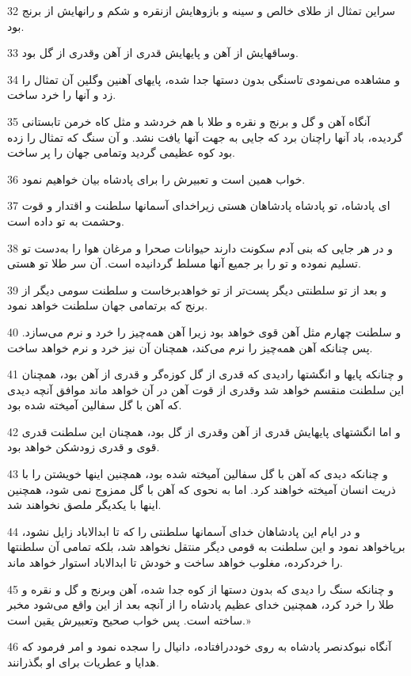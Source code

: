 \par 32 سراین تمثال از طلای خالص و سینه و بازوهایش ازنقره و شکم و رانهایش از برنج بود.
\par 33 وساقهایش از آهن و پایهایش قدری از آهن وقدری از گل بود.
\par 34 و مشاهده می‌نمودی تاسنگی بدون دستها جدا شده، پایهای آهنین وگلین آن تمثال را زد و آنها را خرد ساخت.
\par 35 آنگاه آهن و گل و برنج و نقره و طلا با هم خردشد و مثل کاه خرمن تابستانی گردیده، باد آنها راچنان برد که جایی به جهت آنها یافت نشد. و آن سنگ که تمثال را زده بود کوه عظیمی گردید وتمامی جهان را پر ساخت.
\par 36 خواب همین است و تعبیرش را برای پادشاه بیان خواهیم نمود.
\par 37 ‌ای پادشاه، تو پادشاه پادشاهان هستی زیراخدای آسمانها سلطنت و اقتدار و قوت وحشمت به تو داده است.
\par 38 و در هر جایی که بنی آدم سکونت دارند حیوانات صحرا و مرغان هوا را به‌دست تو تسلیم نموده و تو را بر جمیع آنها مسلط گردانیده است. آن سر طلا تو هستی.
\par 39 و بعد از تو سلطنتی دیگر پست‌تر از تو خواهدبرخاست و سلطنت سومی دیگر از برنج که برتمامی جهان سلطنت خواهد نمود.
\par 40 و سلطنت چهارم مثل آهن قوی خواهد بود زیرا آهن همه‌چیز را خرد و نرم می‌سازد. پس چنانکه آهن همه‌چیز را نرم می‌کند، همچنان آن نیز خرد و نرم خواهد ساخت.
\par 41 و چنانکه پایها و انگشتها رادیدی که قدری از گل کوزه‌گر و قدری از آهن بود، همچنان این سلطنت منقسم خواهد شد وقدری از قوت آهن در آن خواهد ماند موافق آنچه دیدی که آهن با گل سفالین آمیخته شده بود.
\par 42 و اما انگشتهای پایهایش قدری از آهن وقدری از گل بود، همچنان این سلطنت قدری قوی و قدری زودشکن خواهد بود.
\par 43 و چنانکه دیدی که آهن با گل سفالین آمیخته شده بود، همچنین اینها خویشتن را با ذریت انسان آمیخته خواهند کرد. اما به نحوی که آهن با گل ممزوج نمی شود، همچنین اینها با یکدیگر ملصق نخواهند شد.
\par 44 و در ایام این پادشاهان خدای آسمانها سلطنتی را که تا ابدالاباد زایل نشود، برپاخواهد نمود و این سلطنت به قومی دیگر منتقل نخواهد شد، بلکه تمامی آن سلطنتها را خردکرده، مغلوب خواهد ساخت و خودش تا ابدالاباد استوار خواهد ماند.
\par 45 و چنانکه سنگ را دیدی که بدون دستها از کوه جدا شده، آهن وبرنج و گل و نقره و طلا را خرد کرد، همچنین خدای عظیم پادشاه را از آنچه بعد از این واقع می‌شود مخبر ساخته است. پس خواب صحیح وتعبیرش یقین است.»
\par 46 آنگاه نبوکدنصر پادشاه به روی خوددرافتاده، دانیال را سجده نمود و امر فرمود که هدایا و عطریات برای او بگذرانند.

